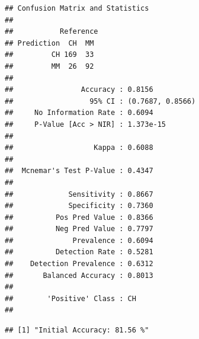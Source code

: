 \documentclass[
]{article}
\newenvironment{Shaded}{\begin{snugshade}}{\end{snugshade}}
\newcommand{\AttributeTok}[1]{\textcolor[rgb]{0.13,0.29,0.53}{#1}}
\newcommand{\DecValTok}[1]{\textcolor[rgb]{0.00,0.00,0.81}{#1}}
\newcommand{\FunctionTok}[1]{\textcolor[rgb]{0.13,0.29,0.53}{\textbf{#1}}}
\newcommand{\NormalTok}[1]{#1}
\newcommand{\OtherTok}[1]{\textcolor[rgb]{0.56,0.35,0.01}{#1}}
\newcommand{\SpecialCharTok}[1]{\textcolor[rgb]{0.81,0.36,0.00}{\textbf{#1}}}
\newcommand{\StringTok}[1]{\textcolor[rgb]{0.31,0.60,0.02}{#1}}
\begin{document}
\begin{Shaded}
\end{Shaded}

\begin{verbatim}
## Confusion Matrix and Statistics
## 
##           Reference
## Prediction  CH  MM
##         CH 169  33
##         MM  26  92
##                                           
##                Accuracy : 0.8156          
##                  95% CI : (0.7687, 0.8566)
##     No Information Rate : 0.6094          
##     P-Value [Acc > NIR] : 1.373e-15       
##                                           
##                   Kappa : 0.6088          
##                                           
##  Mcnemar's Test P-Value : 0.4347          
##                                           
##             Sensitivity : 0.8667          
##             Specificity : 0.7360          
##          Pos Pred Value : 0.8366          
##          Neg Pred Value : 0.7797          
##              Prevalence : 0.6094          
##          Detection Rate : 0.5281          
##    Detection Prevalence : 0.6312          
##       Balanced Accuracy : 0.8013          
##                                           
##        'Positive' Class : CH              
## 
\end{verbatim}

\begin{Shaded}
\end{Shaded}

\begin{verbatim}
## [1] "Initial Accuracy: 81.56 %"
\end{verbatim}
\end{document}
